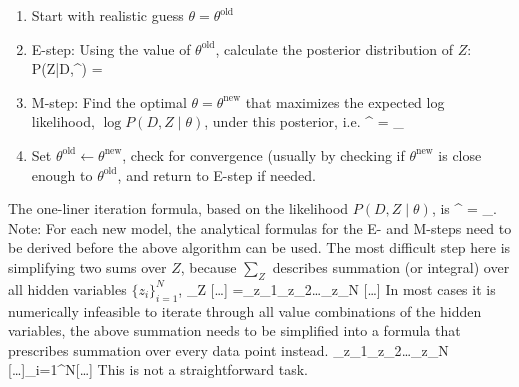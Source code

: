 \begin{enumerate}
	\item Start with realistic guess $\theta = \theta^\text{old}$
	\item E-step: Using the value of $\theta^\text{old}$, calculate the posterior distribution of $Z$: 
	\be 
		P(Z\;|\;D,\theta^) = 
	\ee
	\item M-step: Find the optimal $\theta = \theta^\text{new}$ that maximizes the expected log likelihood, $\log P(D,Z\;|\;\theta)$, under this posterior, i.e.
	\be
		\theta^ = \amax_\theta {}
	\ee
	\item Set $\theta^\text{old} \leftarrow \theta^\text{new}$, check for convergence (usually by checking if $\theta^\text{new}$ is close enough to $\theta^\text{old}$, and return to E-step if needed.
\end{enumerate}
The one-liner iteration formula, based on the likelihood $P(D,Z\;|\;\theta)$, is
	\be
		\theta^ = \amax_\theta{}.
	\ee
\no Note: For each new model, the analytical formulas for the E- and M-steps need to be derived before the above algorithm can be used. The most difficult step here is simplifying two sums over $Z$, because $\sum_Z$ describes summation (or integral) over all hidden variables $\{z_i\}_{i=1}^N$,
\be
	\sum_Z [\ldots] \quad =\quad  \sum_{z_1}\sum_{z_2}\ldots \sum_{z_N} [\ldots]
\ee
In most cases it is numerically infeasible to iterate through all  value combinations of the hidden variables, the above summation needs to be simplified into a formula that prescribes summation over every data point instead.
\be
	\sum_{z_1}\sum_{z_2}\ldots \sum_{z_N} [\ldots]\qquad \rightarrow \qquad \sum_{i=1}^N[\ldots]
\ee
This is not a straightforward task.


